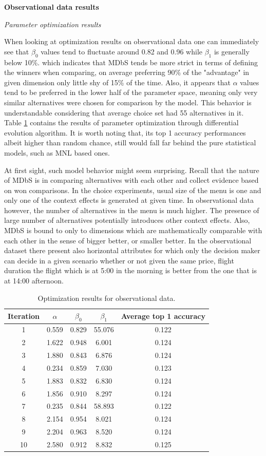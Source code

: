\documentclass[a4paper,12pt]{article}
\begin{document}
\textbf{Observational data results}

\textit{Parameter optimization results}

When looking at optimization results on observational data one can immediately see that $\beta_0$ values tend to fluctuate around 0.82 and 0.96 while $\beta_1$ is generally below 10\%.  which indicates that MDbS tends be more strict in terms of defining the winners when comparing, on average preferring 90\% of the "advantage" in given dimension only little shy of 15\% of the time. Also, it appears that $\alpha$ values tend to be preferred in the lower half of the parameter space, meaning only very similar alternatives were chosen for comparison by the model. This behavior is understandable considering that average choice set had 55 alternatives in it. Table \ref{tab:optimizationAmadeusResults} contains the results of parameter optimization through differential evolution algorithm. It is worth noting that, its top 1 accuracy performances albeit higher than random chance, still would fall far behind the pure statistical models, such as MNL based ones. 

At first sight, such model behavior might seem surprising. Recall that the nature of MDbS is in comparing alternatives with each other and collect evidence based on won comparisons. In the choice experiments, usual size of the menu is one and only one of the context effects is generated at given time. In observational data however, the number of alternatives in the menu is much higher. The presence of large number of alternatives potentially introduces other context effects. Also, MDbS is bound to only to dimensions which are mathematically comparable with each other in the sense of bigger better, or smaller better. In the observational dataset there present also horizontal attributes for which only the decision maker can decide in a given scenario whether or not given the same price, flight duration the flight which is at 5:00 in the morning is better from the one that is at 14:00 afternoon.

\begin{table}
\centering
\begin{tabular}{ccccc}
\hline
Iteration & $\alpha$ & $\beta_0$ & $\beta_1$ & Average top 1 accuracy \\
\hline
1 & 0.559 & 0.829 & 55.076 & 0.122 \\
2 & 1.622 & 0.948 & 6.001 & 0.124 \\
3 & 1.880 & 0.843 & 6.876 & 0.124 \\
4 & 0.234 & 0.859 & 7.030 & 0.123 \\
5 & 1.883 & 0.832 & 6.830 & 0.124 \\
6 & 1.856 & 0.910 & 8.297 & 0.124 \\
7 & 0.235 & 0.844 & 58.893 & 0.122 \\
8 & 2.154 & 0.954 & 8.021 & 0.124 \\
9 & 2.204 & 0.963 & 8.520 & 0.124 \\
10 & 2.580 & 0.912 & 8.832 & 0.125 \\
\hline
\end{tabular}
\caption{Optimization results for observational data.}
\label{tab:optimizationAmadeusResults}
\end{table}
\end{document}
